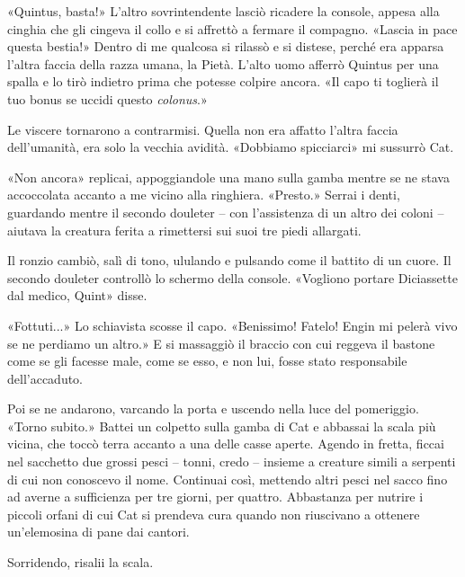 «Quintus, basta!» L'altro sovrintendente lasciò ricadere la console,
appesa alla cinghia che gli cingeva il collo e si affrettò a fermare il
compagno. «Lascia in pace questa bestia!» Dentro di me qualcosa si
rilassò e si distese, perché era apparsa l'altra faccia della razza
umana, la Pietà. L'alto uomo afferrò Quintus per una spalla e lo tirò
indietro prima che potesse colpire ancora. «Il capo ti toglierà il tuo
bonus se uccidi questo \emph{colonus}.»

Le viscere tornarono a contrarmisi. Quella non era affatto l'altra
faccia dell'umanità, era solo la vecchia avidità. «Dobbiamo spicciarci»
mi sussurrò Cat.

«Non ancora» replicai, appoggiandole una mano sulla gamba mentre se ne
stava accoccolata accanto a me vicino alla ringhiera. «Presto.» Serrai i
denti, guardando mentre il secondo douleter -- con l'assistenza di un
altro dei coloni -- aiutava la creatura ferita a rimettersi sui suoi tre
piedi allargati.

Il ronzio cambiò, salì di tono, ululando e pulsando come il battito di
un cuore. Il secondo douleter controllò lo schermo della console.
«Vogliono portare Diciassette dal medico, Quint» disse.

«Fottuti...» Lo schiavista scosse il capo. «Benissimo! Fatelo! Engin mi
pelerà vivo se ne perdiamo un altro.» E si massaggiò il braccio con cui
reggeva il bastone come se gli facesse male, come se esso, e non lui,
fosse stato responsabile dell'accaduto.

Poi se ne andarono, varcando la porta e uscendo nella luce del
pomeriggio. «Torno subito.» Battei un colpetto sulla gamba di Cat e
abbassai la scala più vicina, che toccò terra accanto a una delle casse
aperte. Agendo in fretta, ficcai nel sacchetto due grossi pesci --
tonni, credo -- insieme a creature simili a serpenti di cui non
conoscevo il nome. Continuai così, mettendo altri pesci nel sacco fino
ad averne a sufficienza per tre giorni, per quattro. Abbastanza per
nutrire i piccoli orfani di cui Cat si prendeva cura quando non
riuscivano a ottenere un'elemosina di pane dai cantori.

Sorridendo, risalii la scala.


